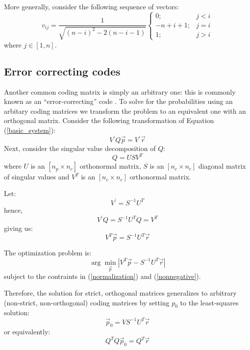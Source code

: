 \documentclass{article}
\begin{document}
More generally, consider the following sequence of vectors:
\begin{equation}
	v_{ij} = \frac{1}{\sqrt{(n-i)^2-2(n-i-1)}} \left \lbrace \begin{array}{rl}
			0; & j < i \\
			-n+i+1; & j=i \\
			1; & j > i
		\end{array} \right .
\end{equation}
where $j \in [1, n]$. \citep{Boyd_Vandenberghe2004}

\subsection{Error correcting codes}

Another common coding matrix is simply an arbitrary one: this is commonly
known as an ``error-correcting'' code \citep{Dietterich_Bakiri1995}.
To solve for the probabilities using an arbitary coding matrices
we transform the problem to an equivalent one with an orthogonal
matrix.
Consider the following transformation of Equation (\ref{basic_system}):
\begin{equation}
	V^\prime Q \vec p = V^\prime \vec r
\end{equation}
Next, consider the singular value decomposition of $Q$:
\begin{equation}
	Q = U S V^T
\end{equation}
where $U$ is an $[n_p \times n_c]$ orthonormal matrix, 
$S$ is an $[n_c \times n_c]$ diagonal matrix of singular values
and
$V^T$ is an $[n_c \times n_c]$ orthonormal matrix.

Let:
\begin{equation}
	V^\prime = S^{-1} U^T
\end{equation}
hence,
\begin{equation}
	V^\prime Q = S^{-1} U^T Q = V^T
\end{equation}
giving us:
\begin{equation}
	V^T \vec p = S^{-1} U^T \vec r
\end{equation}

The optimization problem is:
\begin{equation}
	\arg \min_{\vec p} | V^T \vec p - S^{-1} U^T \vec r |
\end{equation}
subject to the contraints in (\ref{normalization}) and (\ref{nonnegative}).

Therefore, the solution for strict, orthogonal matrices generalizes to 
arbitrary (non-strict, non-orthogonal) coding matrices by setting $p_0$ to the least-squares solution:
\begin{equation}
	\vec p_0 = V S^{-1} U^T \vec r
\end{equation}
or equivalently:
\begin{equation}
	Q^T Q \vec p_0 = Q^T \vec r
\end{equation}
\end{document}
